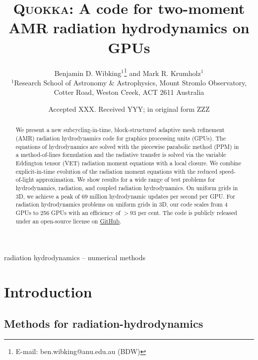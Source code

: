 \documentclass[fleqn,usenatbib]{mnras}
\title[Two-moment AMR radiation hydrodynamics on GPUs]{\textsc{Quokka}: A code for two-moment AMR radiation hydrodynamics on GPUs}
\author[B. D. Wibking et al.]{
    Benjamin D. Wibking$^{1}$\thanks{E-mail: ben.wibking@anu.edu.au (BDW)}
    and Mark R. Krumholz$^{1}$
\\
$^{1}$Research School of Astronomy \& Astrophysics, Mount Stromlo Observatory, Cotter Road, Weston Creek, ACT 2611 Australia\\
}
\date{Accepted XXX. Received YYY; in original form ZZZ}
\begin{document}
\label{firstpage}
\pagerange{\pageref{firstpage}--\pageref{lastpage}}
\maketitle

\begin{abstract}
    We present a new subcycling-in-time, block-structured adaptive mesh refinement (AMR) radiation hydrodynamics code for graphics processing units (GPUs). The equations of hydrodynamics are solved with the piecewise parabolic method (PPM) in a method-of-lines formulation and the radiative transfer is solved via the variable Eddington tensor (VET) radiation moment equations with a local closure. We combine explicit-in-time evolution of the radiation moment equations with the reduced speed-of-light approximation. We show results for a wide range of test problems for hydrodynamics, radiation, and coupled radiation hydrodynamics. On uniform grids in 3D, we achieve a peak of $69$ million hydrodynamic updates per second per GPU. For radiation hydrodynamics problems on uniform grids in 3D, our code scales from 4 GPUs to 256 GPUs with an efficiency of $>93$ per cent. The code is publicly released under an open-source license on \faGithub\href{https://github.com/BenWibking/quokka-code}{GitHub}.
\end{abstract}

\begin{keywords}
radiation hydrodynamics -- numerical methods
\end{keywords}



\section{Introduction}


\subsection{Methods for radiation-hydrodynamics}
\end{document}
